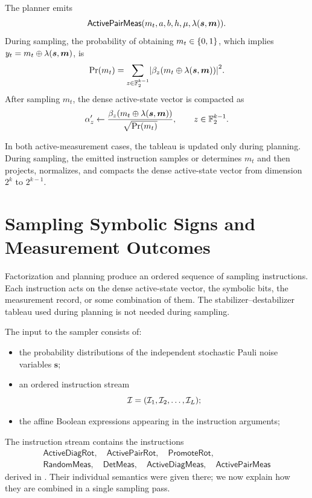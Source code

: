 \documentclass[a4paper,onecolumn,unpublished]{quantumarticle}
\newcommand{\cref}[1]{\zcref{#1}}
\DeclarePairedDelimiter\rbra{\lparen}{\rparen}
\DeclarePairedDelimiter\cbra{\{}{\}}
\DeclarePairedDelimiter\abs{\lvert}{\rvert}
\newcommand{\iFont}[1]{\textsf{#1}}
\newcommand{\iActiveDiagRot}{\iFont{ActiveDiagRot}}
\newcommand{\iActivePairRot}{\iFont{ActivePairRot}}
\newcommand{\iPromoteRot}{\iFont{PromoteRot}}
\newcommand{\iRandomMeas}{\iFont{RandomMeas}}
\newcommand{\iDetMeas}{\iFont{DetMeas}}
\newcommand{\iActiveDiagMeas}{\iFont{ActiveDiagMeas}}
\newcommand{\iActivePairMeas}{\iFont{ActivePairMeas}}
\newcommand{\FF}{\mathbb{F}}
\begin{document}
The planner emits
\begin{equation*}
    \iActivePairMeas\rbra*{m_t, a, b, h, \mu, \lambda\rbra*{\bm{s},\bm{m}}}.
\end{equation*}
During sampling, the probability of obtaining $m_t \in \cbra{0,1}$, which implies $y_t = m_t\oplus \lambda\rbra{\bm{s},\bm{m}}$, is
\begin{equation*}
    \Pr\rbra{m_t} = \sum_{z \in \FF_2^{k-1}} \abs*{\beta_z\rbra{m_t\oplus \lambda\rbra{\bm{s},\bm{m}}}}^2.
\end{equation*}
After sampling $m_t$, the dense active-state vector is compacted as
\begin{equation*}
    \alpha_{z}' \gets \frac{\beta_z\rbra{m_t\oplus \lambda\rbra{\bm{s},\bm{m}}}}{\sqrt{\Pr\rbra{m_t}}}, \qquad z \in \FF_2^{k-1}.
\end{equation*}

In both active-measurement cases, the tableau is updated only during planning.
During sampling, the emitted instruction samples or determines $m_t$ and then projects, normalizes, and compacts the dense active-state vector from dimension $2^k$ to $2^{k-1}$.

\section{Sampling Symbolic Signs and Measurement Outcomes}
\label{sec:sampling}

Factorization and planning produce an ordered sequence of sampling instructions.
Each instruction acts on the dense active-state vector, the symbolic bits, the measurement record, or some combination of them.
The stabilizer--destabilizer tableau used during planning is not needed during sampling.

The input to the sampler consists of:
\begin{itemize}
    \item the probability distributions of the independent stochastic Pauli noise variables $\bm{s}$;
    \item an ordered instruction stream
    \begin{equation*}
        \mathcal{I}
        =
        \rbra{\mathcal{I}_1,\mathcal{I}_2,\ldots,\mathcal{I}_L};
    \end{equation*}
    \item the affine Boolean expressions appearing in the instruction arguments;
\end{itemize}
The instruction stream contains the instructions
\begin{gather*}
    \iActiveDiagRot, \quad
    \iActivePairRot, \quad
    \iPromoteRot, \\
    \iRandomMeas, \quad
    \iDetMeas, \quad
    \iActiveDiagMeas, \quad
    \iActivePairMeas
\end{gather*}
derived in \cref{sec:planning}.
Their individual semantics were given there; we now explain how they are combined in a single sampling pass.
\end{document}
